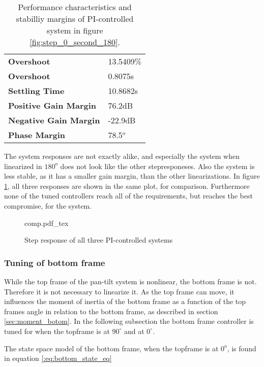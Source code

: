 \documentclass[../../../Main]{subfiles}
\begin{document}
\begin{table}[h]
	 \centering
	 \begin{tabular}{ll}
		 \textbf{Overshoot} & 13.5409\%\\
		 \textbf{Overshoot} & 0.8075s\\
		 \textbf{Settling Time} & 10.8682s\\
		 \textbf{Positive Gain Margin} & 76.2dB\\
		 \textbf{Negative Gain Margin} & -22.9dB\\
		 \textbf{Phase Margin} & 78.5$^o$
	 \end{tabular}
	 \caption{Performance characteristics and stabilliy margins of PI-controlled system in figure \ref{fig:step_0_second_180}.}
	 \label{tab:performance_0_4}
\end{table}

The system responses are not exactly alike, and especially the system when linearized in $180^o$ does not look like the other stepresponeses. Also the system is less stable, as it has a smaller gain margin, than the other linearizations. In figure \ref{fig:comp}, all three responses are shown in the same plot, for comparison. Furthermore none of the tuned controllers reach all of the requirements, but reaches the best compromise, for the system.

\begin{figure}[H]
\centering
\def\svgwidth{\textwidth}
{comp.pdf_tex}
\caption{Step response of all three PI-controlled systems}
\label{fig:comp}
\end{figure}

\subsubsection{Tuning of bottom frame}

While the top frame of the pan-tilt system is nonlinear, the bottom frame is not. Therefore it is not necessary to linearize it. As the top frame can move, it influences the moment of inertia of the bottom frame as a function of the top frames angle in relation to the bottom frame, as described in section \ref{sec:moment_botom}.
In the following subsection the bottom frame controller is tuned for when the topframe is at $90^\circ$ and at $0^\circ$.

The state space model of the bottom frame, when the topframe is at $0^o$, is found in equation \eqref{:eq:bottom_state_eq}
\end{document}
